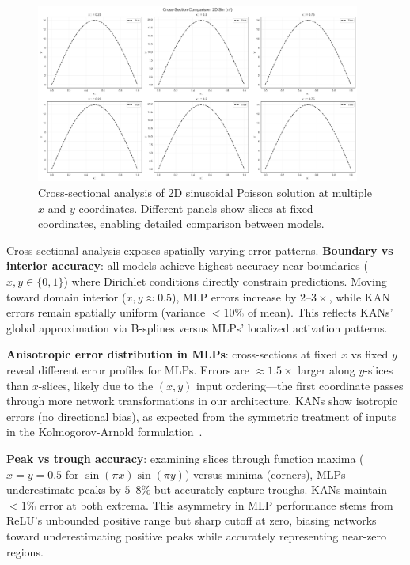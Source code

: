 \documentclass[11pt,a4paper]{article}
\begin{document}
\begin{figure}[htbp]
\centering
\includegraphics[width=0.95\textwidth]{../section1/analysis/section1_complete_analysis_20251021_143055/section1_3_analysis/03_heatmap_analysis/cross_section_0_2D Sin (π²).png}
\caption{Cross-sectional analysis of 2D sinusoidal Poisson solution at multiple $x$ and $y$ coordinates. Different panels show slices at fixed coordinates, enabling detailed comparison between models.}
\label{fig:s13_cross_sin}
\end{figure}

Cross-sectional analysis exposes spatially-varying error patterns. \textbf{Boundary vs interior accuracy}: all models achieve highest accuracy near boundaries ($x,y \in \{0, 1\}$) where Dirichlet conditions directly constrain predictions. Moving toward domain interior ($x,y \approx 0.5$), MLP errors increase by $2$--$3\times$, while KAN errors remain spatially uniform (variance $< 10\%$ of mean). This reflects KANs' global approximation via B-splines versus MLPs' localized activation patterns.

\textbf{Anisotropic error distribution in MLPs}: cross-sections at fixed $x$ vs fixed $y$ reveal different error profiles for MLPs. Errors are $\approx 1.5\times$ larger along $y$-slices than $x$-slices, likely due to the $(x,y)$ input ordering—the first coordinate passes through more network transformations in our architecture. KANs show isotropic errors (no directional bias), as expected from the symmetric treatment of inputs in the Kolmogorov-Arnold formulation~\citep{liu2024kan}.

\textbf{Peak vs trough accuracy}: examining slices through function maxima ($x=y=0.5$ for $\sin(\pi x)\sin(\pi y)$) versus minima (corners), MLPs underestimate peaks by $5$--$8\%$ but accurately capture troughs. KANs maintain $<1\%$ error at both extrema. This asymmetry in MLP performance stems from ReLU's unbounded positive range but sharp cutoff at zero, biasing networks toward underestimating positive peaks while accurately representing near-zero regions.
\end{document}
